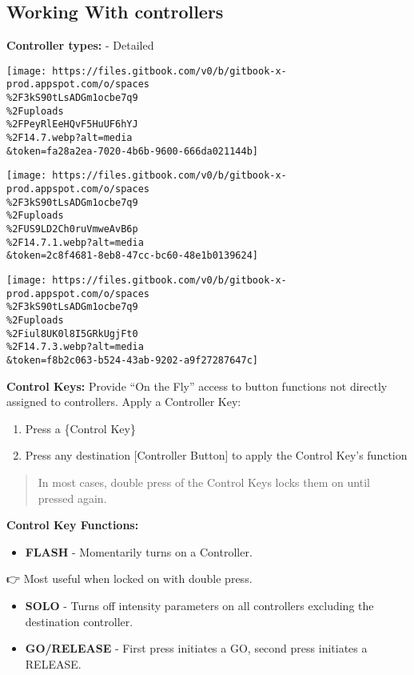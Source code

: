 \documentclass[
]{article}
\providecommand{\tightlist}{%
  \setlength{\itemsep}{0pt}\setlength{\parskip}{0pt}}
\begin{document}
\hypertarget{working-with-controllers}{%
\subsection{Working With controllers}\label{working-with-controllers}}

\textbf{Controller types:} - Detailed

\texttt{[image: https://files.gitbook.com/v0/b/gitbook-x-prod.appspot.com/o/spaces\\\%2F3kS90tLsADGm1ocbe7q9\\\%2Fuploads\\\%2FPeyRlEeHQvF5HuUF6hYJ\\\%2F14.7.webp?alt=media\\\&token=fa28a2ea-7020-4b6b-9600-666da021144b]}

\texttt{[image: https://files.gitbook.com/v0/b/gitbook-x-prod.appspot.com/o/spaces\\\%2F3kS90tLsADGm1ocbe7q9\\\%2Fuploads\\\%2FUS9LD2Ch0ruVmweAvB6p\\\%2F14.7.1.webp?alt=media\\\&token=2c8f4681-8eb8-47cc-bc60-48e1b0139624]}

\texttt{[image: https://files.gitbook.com/v0/b/gitbook-x-prod.appspot.com/o/spaces\\\%2F3kS90tLsADGm1ocbe7q9\\\%2Fuploads\\\%2Fiul8UK0l8I5GRkUgjFt0\\\%2F14.7.3.webp?alt=media\\\&token=f8b2c063-b524-43ab-9202-a9f27287647c]}

\textbf{Control Keys:} Provide ``On the Fly'' access to button functions not directly assigned to controllers. Apply a Controller Key:

\begin{enumerate}
\def\labelenumi{\arabic{enumi}.}
\item
  Press a \{Control Key\}
\item
  Press any destination {[}Controller Button{]} to apply the Control Key's function
\end{enumerate}

\begin{quote}
In most cases, double press of the Control Keys locks them on until pressed again.
\end{quote}

\textbf{Control Key Functions:}

\begin{itemize}
\tightlist
\item
  \textbf{FLASH} - Momentarily turns on a Controller.
\end{itemize}

👉 Most useful when locked on with double press.

\begin{itemize}
\item
  \textbf{SOLO} - Turns off intensity parameters on all controllers excluding the destination controller.
\item
  \textbf{GO/RELEASE} - First press initiates a GO, second press initiates a RELEASE.
\end{itemize}
\end{document}
